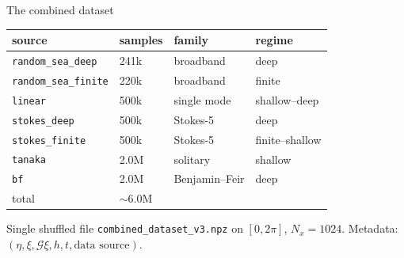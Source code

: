 \documentclass[aspectratio=169,11pt]{beamer}
\newcommand{\Gop}{\mathcal{G}}
\begin{document}
\begin{frame}{The combined dataset}

\small
\begin{tabular}{llll}
\toprule
source & samples & family & regime \\
\midrule
\texttt{random\_sea\_deep}        & 241k  & broadband        & deep \\
\texttt{random\_sea\_finite}      & 220k  & broadband        & finite \\
\texttt{linear}                   & 500k  & single mode      & shallow--deep \\
\texttt{stokes\_deep}             & 500k  & Stokes-5         & deep \\
\texttt{stokes\_finite}           & 500k  & Stokes-5         & finite--shallow \\
\texttt{tanaka}                   & 2.0M  & solitary         & shallow \\
\texttt{bf}                       & 2.0M  & Benjamin--Feir   & deep \\
\midrule
total                             & $\sim$6.0M & & \\
\bottomrule
\end{tabular}

\pause
\vspace{0.5em}
Single shuffled file \texttt{combined\_dataset\_v3.npz} on $[0, 2\pi]$, $N_x = 1024$.
Metadata: $(\eta, \xi, \Gop\xi, h, t, \text{data source})$.
\end{frame}
\end{document}
